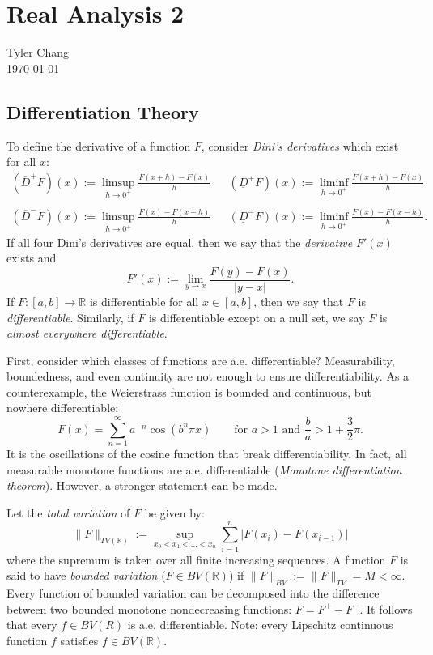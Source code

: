\documentclass[12pt]{article}
\begin{document}
\section*{Real Analysis 2}
Tyler Chang\\
\today

\subsection*{Differentiation Theory}

To define the derivative of a function $F$, consider {\it Dini's derivatives}
which exist for all $x$:
$$ \begin{array}{ccc}
({\overline D}^+ F)(x) := \limsup_{h\rightarrow 0^+} \frac{F(x+h) - F(x)}{h} & &
({\underline D}^+ F)(x) := \liminf_{h\rightarrow 0^+} \frac{F(x+h) - F(x)}{h} \\
& \\
({\overline D}^- F)(x) := \limsup_{h\rightarrow 0^+} \frac{F(x) - F(x-h)}{h} & &
({\underline D}^- F)(x) := \liminf_{h\rightarrow 0^+} \frac{F(x) - F(x-h)}{h}.
\end{array} $$
If all four Dini's derivatives are equal, then we say that the {\it derivative}
$F'(x)$ exists and
$$F'(x) := \lim_{y\rightarrow x} \frac{F(y) - F(x)}{|y-x|}.$$
If $F : [a,b] \rightarrow \mathbb{R}$ is differentiable for all $x\in[a,b]$, 
then we say that $F$ is {\it differentiable}.
Similarly, if $F$ is differentiable except on a null set, we say $F$ is 
{\it almost everywhere differentiable}.

First, consider which classes of functions are a.e. differentiable?
Measurability, boundedness, and even continuity are not enough to ensure 
differentiability.
As a counterexample, the Weierstrass function
is bounded and continuous, but nowhere differentiable:
$$
F(x) = \sum_{n=1}^\infty a^{-n} \cos(b^n\pi x) 
\qquad\text{for $a > 1$ and $\frac{b}{a} > 1 + \frac{3}{2}\pi$.}
$$
It is the oscillations of the cosine function that break differentiability.
In fact, all measurable monotone functions are a.e. differentiable 
({\it Monotone differentiation theorem}).
However, a stronger statement can be made.

Let the {\it total variation} of $F$ be given by:
$$
\|F\|_{TV(\mathbb{R})} 
:= \sup_{x_0<x_1<\ldots<x_n} \sum_{i=1}^n |F(x_i) - F(x_{i-1})|
$$
where the supremum is taken over all finite increasing sequences.
A function $F$ is said to have {\it bounded variation} ($F \in BV(\mathbb{R})$)
if $\|F\|_{BV} := \|F\|_{TV} = M < \infty$.
Every function of bounded variation can be decomposed into the difference
between two bounded monotone nondecreasing functions: $F = F^+ - F^-$.
It follows that every $f\in BV(R)$ is a.e. differentiable.
Note: every Lipschitz continuous function $f$ satisfies $f\in BV(\mathbb{R})$.
\end{document}
